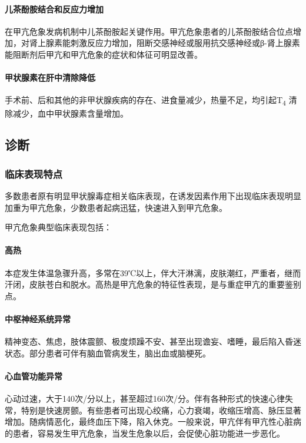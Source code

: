 \paragraph{儿茶酚胺结合和反应力增加}

在甲亢危象发病机制中儿茶酚胺起关键作用。甲亢危象患者的儿茶酚胺结合位点增加，对肾上腺素能刺激反应力增加，阻断交感神经或服用抗交感神经或β-肾上腺素能阻断剂后甲亢和甲亢危象的症状和体征可明显改善。

\paragraph{甲状腺素在肝中清除降低}

手术前、后和其他的非甲状腺疾病的存在、进食量减少，热量不足，均引起T\textsubscript{4}
清除减少，血中甲状腺素含量增加。

\subsection{诊断}

\subsubsection{临床表现特点}

多数患者原有明显甲状腺毒症相关临床表现，在诱发因素作用下出现临床表现明显加重为甲亢危象，少数患者起病迅猛，快速进入到甲亢危象。

甲亢危象典型临床表现包括：

\paragraph{高热}

本症发生体温急骤升高，多常在39℃以上，伴大汗淋漓，皮肤潮红，严重者，继而汗闭，皮肤苍白和脱水。高热是甲亢危象的特征性表现，是与重症甲亢的重要鉴别点。

\paragraph{中枢神经系统异常}

精神变态、焦虑，肢体震颤、极度烦躁不安、甚至出现谵妄、嗜睡，最后陷入昏迷状态。部分患者可伴有脑血管病发生，脑出血或脑梗死。

\paragraph{心血管功能异常}

心动过速，大于140次/分以上，甚至超过160次/分。伴有各种形式的快速心律失常，特别是快速房颤。有些患者可出现心绞痛，心力衰竭，收缩压增高、脉压显著增加。随病情恶化，最终血压下降，陷入休克。一般来说，甲亢伴有甲亢性心脏病的患者，容易发生甲亢危象，当发生危象以后，会促使心脏功能进一步恶化。

